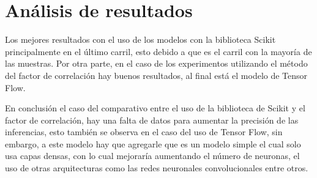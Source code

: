 \section{Análisis de resultados}

Los mejores resultados con el uso de los modelos con la biblioteca Scikit principalmente en el último carril, esto debido a que es el carril con la mayoría de las muestras. Por otra parte, en el caso de los experimentos utilizando el método del factor de correlación hay buenos resultados, al final está el modelo de Tensor Flow.

En conclusión el caso del comparativo entre el uso de la biblioteca de Scikit y el factor de correlación, hay una falta de datos para aumentar la precisión de las inferencias, esto también se observa en el caso del uso de Tensor Flow, sin embargo, a este modelo hay que agregarle que es un modelo simple el cual solo usa capas densas, con lo cual mejoraría aumentando el número de neuronas, el uso de otras arquitecturas como las redes neuronales convolucionales entre otros.
